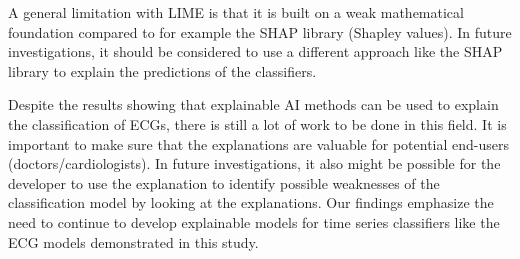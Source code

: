A general limitation with LIME is that it is built on a weak mathematical foundation compared to for example the SHAP library \cite{lundberg_unified_2017} (Shapley values). 
In future investigations, it should be considered to use a different approach like the SHAP library to explain the predictions of the classifiers. 


Despite the results showing that explainable AI methods can be used to explain the classification of ECGs, there is still a lot of work to be done in this field. It is important to make sure that the explanations are valuable for potential end-users (doctors/cardiologists). In future investigations, it also might be possible for the developer to use the explanation to identify possible weaknesses of the classification model by looking at the explanations. Our findings emphasize the need to continue to develop explainable models for time series classifiers like the ECG models demonstrated in this study. 